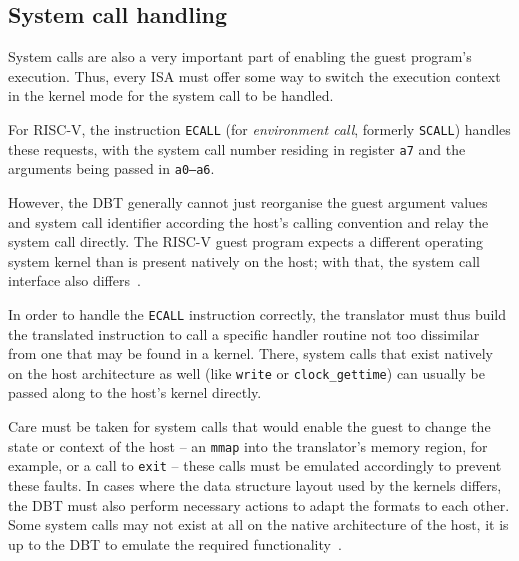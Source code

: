 



\subsection{System call handling}
\label{sec:syscall-handling}
System calls are also a very important part of enabling the guest program's execution.
Thus, every ISA must offer some way to switch the execution context in the kernel mode for the system call to be handled.

For RISC-V, the instruction \texttt{ECALL} (for \textit{environment call}, formerly \texttt{SCALL}) handles these requests, with the system call number residing in register \texttt{a7} and the arguments being passed in \texttt{a0--a6}.

However, the DBT generally cannot just reorganise the guest argument values and system call identifier according the host's calling convention and relay the system call directly.
The RISC-V guest program expects a different operating system kernel than is present natively on the host;
with that, the system call interface also differs~\cite[S. 2f.]{bintrans}.

In order to handle the \texttt{ECALL} instruction correctly, the translator must thus build the translated instruction to call a specific handler routine not too dissimilar from one that may be found in a kernel.
There, system calls that exist natively on the host architecture as well (like \texttt{write} or \texttt{clock\_gettime}) can usually be passed along to the host's kernel directly.

Care must be taken for system calls that would enable the guest to change the state or context of the host -- an \texttt{mmap} into the translator's memory region, for example, or a call to \texttt{exit} -- these calls must be emulated accordingly to prevent these faults.
In cases where the data structure layout used by the kernels differs, the DBT must also perform necessary actions to adapt the formats to each other.
Some system calls may not exist at all on the native architecture of the host, it is up to the DBT to emulate the required functionality~\cite[S. 2f.]{bintrans}.


















